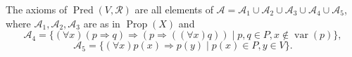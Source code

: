 The axioms of $\operatorname{Pred}(V, \mathcal{R})$ are all elements of $\mathcal{A} = \mathcal{A}_1 \cup \mathcal{A}_2 \cup \mathcal{A}_3 \cup \mathcal{A}_4 \cup \mathcal{A}_5$, where $\mathcal{A}_1, \mathcal{A}_2, \mathcal{A}_3$ are as in $\operatorname{Prop}(X)$ and
$$\mathcal{A}_4 = \{(\forall x)(p \Rightarrow q) \Rightarrow (p \Rightarrow ((\forall x)q)) \mid p, q \in P, x \notin \operatorname{var}(p)\},$$
$$\mathcal{A}_5 = \{(\forall x)p(x) \Rightarrow p(y) \mid p(x) \in P, y \in V\}.$$

